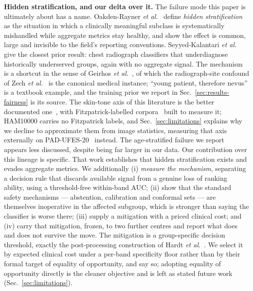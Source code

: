 \documentclass[journal]{IEEEtran}
\begin{document}
\textbf{Hidden stratification, and our delta over it.} The failure mode this paper is
ultimately about has a name. Oakden-Rayner \emph{et al.}~\cite{oakdenrayner2020hidden} define
\emph{hidden stratification} as the situation in which a clinically meaningful subclass is
systematically mishandled while aggregate metrics stay healthy, and show the effect is common,
large and invisible to the field's reporting conventions. Seyyed-Kalantari
\emph{et al.}~\cite{seyyedkalantari2021underdiagnosis} give the closest prior result: chest
radiograph classifiers that underdiagnose historically underserved groups, again with no
aggregate signal. The mechanism is a shortcut in the sense of Geirhos
\emph{et al.}~\cite{geirhos2020shortcut}, of which the radiograph-site confound of Zech
\emph{et al.}~\cite{zech2018confounding} is the canonical medical instance; ``young patient,
therefore nevus'' is a textbook example, and the training prior we report in
Sec.~\ref{sec:results-fairness} is its source. The skin-tone axis of this literature is the
better documented one~\cite{daneshjou2022disparities}, with Fitzpatrick-labelled
corpora~\cite{groh2021fitzpatrick17k} built to measure it; HAM10000 carries no Fitzpatrick
labels, and Sec.~\ref{sec:limitations} explains why we decline to approximate them from image
statistics, measuring that axis externally on PAD-UFES-20~\cite{pacheco2020padufes} instead.
The age-stratified failure we report appears less discussed, despite being far larger in our
data. Our contribution over this lineage is specific. That work establishes that hidden
stratification exists and evades aggregate metrics. We additionally (i) \emph{measure the
mechanism}, separating a decision rule that discards available signal from a genuine loss of
ranking ability, using a threshold-free within-band AUC; (ii) show that the standard safety
mechanisms --- abstention, calibration and conformal sets --- are themselves inoperative in
the affected subgroup, which is stronger than saying the classifier is worse there; (iii)
supply a mitigation with a priced clinical cost; and (iv) carry that mitigation, frozen, to
two further centres and report what does and does not survive the move. The mitigation is a
group-specific decision threshold, exactly the post-processing construction of Hardt
\emph{et al.}~\cite{hardt2016equality}. We select it by expected clinical cost under a
per-band specificity floor rather than by their formal target of equality of opportunity, and
say so; adopting equality of opportunity directly is the cleaner objective and is left as
stated future work (Sec.~\ref{sec:limitations}).
\end{document}
